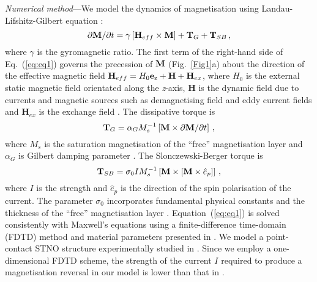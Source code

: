 \documentclass[aps,prl,reprint,superscriptaddress]{revtex4-2}
\begin{document}
{\it Numerical method}---We model the dynamics of magnetisation using Landau-Lifshitz-Gilbert equation \cite{Sla09}:
\begin{equation}
  \label{eq:eq1}
  \partial{\bf M}/\partial t = \gamma\left[{\bf H}_{eff}\times\bf M\right] + {\bf T}_G + {\bf T}_{SB}\,, 
\end{equation}
where $\gamma$ is the gyromagnetic ratio. The first term of the right-hand side of Eq.~(\ref{eq:eq1}) governs the precession of $\bf M$ (Fig.~\ref{Fig1}a) about the direction of the effective magnetic field $\textbf{H}_{eff}=H_{0}\textbf{e}_{\rm{z}} + \textbf{H} + \textbf{H}_{ex}$, where $H_{0}$ is the external static magnetic field orientated along the \textit{z}-axis, $\textbf{H}$ is the dynamic field due to currents and magnetic sources such as demagnetising field and eddy current fields and $\textbf{H}_{ex}$ is the exchange field \cite{Mak13}. The dissipative torque is \cite{Sla09}
\begin{equation}
  \label{eq:eq2}
  {\bf T}_G = \alpha_G M_s^{-1}\left[{\bf M}\times{\partial\bf M}/{\partial t}\right]\,, 
\end{equation}
where $M_s$ is the saturation magnetisation of the ``free'' magnetisation layer and $\alpha_G$ is Gilbert damping parameter \cite{Mak13, Sla09}. The Slonczewski-Berger torque is 
\begin{equation}
  \label{eq:eq5}
  {\bf T}_{SB} = \sigma_0IM_s^{-1}\left[{\bf M}\times\left[{\bf M}\times\hat{e}_p\right]\right]\,, 
\end{equation}
where $I$ is the strength and $\hat{e}_p$ is the direction of the spin polarisation of the current. The parameter $\sigma_0$ incorporates fundamental physical constants and the thickness of the ``free'' magnetisation layer \cite{Sla09}. Equation~(\ref{eq:eq1}) is solved consistently with Maxwell's equations using a finite-difference time-domain (FDTD) method and material parameters presented in \cite{Mak13}. We model a point-contact STNO structure experimentally  studied in \cite{Rip04}. Since we employ a one-dimensional FDTD scheme, the strength of the current $I$ required to produce a magnetisation reversal in our model is lower than that in \cite{Rip04}. 



\end{document}
